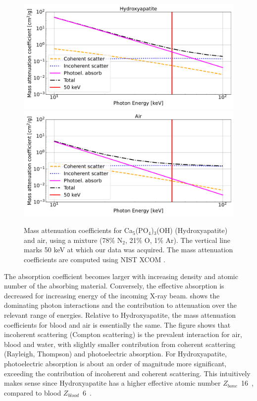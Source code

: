\begin{figure}
    \centering
    \includegraphics[width=\linewidth]{figures/attenuation_bone.pdf}
    \includegraphics[width=\linewidth]{figures/attenuation_air.pdf}
    \caption{
	    Mass attenuation coefficients for Ca$_{5}$(PO$_{4}$)$_{3}$(OH)
	    (Hydroxyapatite) and air, using a mixture (78\% N$_{2}$, 21\% O, 1\%
	    Ar). The vertical line marks 50 keV at which our data was acquired. The
	    mass attenuation coefficients are computed using NIST XCOM
	    \cite{NIST-XCOM}.
    }
\label{fig:attenuation}
\end{figure}

The absorption coefficient becomes larger with increasing density and atomic
number of the absorbing material. Conversely, the effective absorption is
decreased for increasing energy of the incoming X-ray beam.
 shows the dominating photon interactions and the
contribution to attenuation over the relevant range of energies. Relative to
Hydroxyapatite, the mass attenuation coefficients for blood and air is
essentially the same. The figure shows that incoherent scattering (Compton
scattering) is the prevalent interaction for air, blood and water, with slightly
smaller contribution from coherent scattering (Rayleigh, Thompson) and
photoelectric absorption. For Hydroxyapatite, photoelectric absorption is about
an order of magnitude more significant, exceeding the contribution of incoherent
and coherent scattering. This intuitively makes sense since Hydroxyapatite has a
higher effective atomic number $Z_{bone}$~16~\cite{hydroxyapatite_absorption},
compared to blood $Z_{blood}$~6~\cite{effective_atomic_number}.

